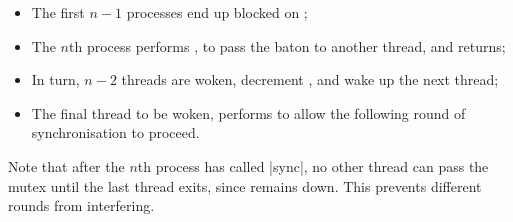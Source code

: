 \begin{slide}

\begin{itemize}
\item
The first $n-1$ processes  end up blocked on ;

\item The $n$th process performs , to pass the baton to
another thread, and returns;

\item In turn, $n-2$ threads are woken, decrement , and wake up
the next thread;

\item The final thread to be woken, performs  to allow the
following round of synchronisation to proceed.
\end{itemize}

Note that after the $n$th process has called |sync|, no other thread can pass
the mutex until the last thread exits, since  remains down.
This prevents different rounds from interfering.
\end{slide}







